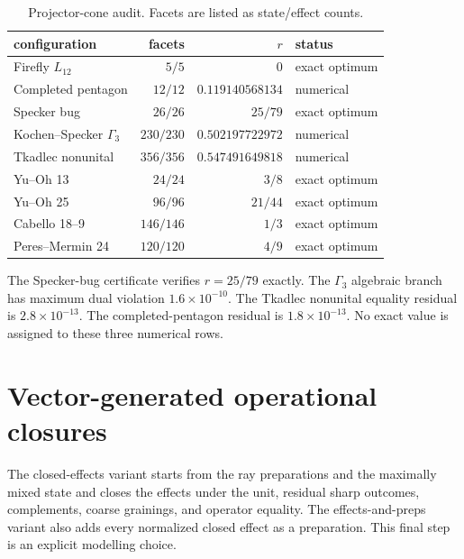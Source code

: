 \documentclass[11pt]{article}
\begin{document}
\begin{table}[ht]
\centering
\caption{Projector-cone audit.  Facets are listed as state/effect counts.}
\label{tab:projector}
\small
\begin{tabular}{lrrl}
\toprule
configuration & facets & $r$ & status\\
\midrule
Firefly $L_{12}$ & $5/5$ & $0$ & exact optimum\\
Completed pentagon & $12/12$ & $0.119140568134$ & numerical\\
Specker bug & $26/26$ & $25/79$ & exact optimum\\
Kochen--Specker $\Gamma_3$ & $230/230$ & $0.502197722972$ & numerical\\
Tkadlec nonunital & $356/356$ & $0.547491649818$ & numerical\\
Yu--Oh 13 & $24/24$ & $3/8$ & exact optimum\\
Yu--Oh 25 & $96/96$ & $21/44$ & exact optimum\\
Cabello 18--9 & $146/146$ & $1/3$ & exact optimum\\
Peres--Mermin 24 & $120/120$ & $4/9$ & exact optimum\\
\bottomrule
\end{tabular}
\end{table}

The Specker-bug certificate verifies $r=25/79$ exactly.  The $\Gamma_3$
algebraic branch has maximum dual violation $1.6\times10^{-10}$.  The Tkadlec
nonunital equality residual is $2.8\times10^{-13}$.  The completed-pentagon
residual is $1.8\times10^{-13}$.  No exact value is assigned to these three
numerical rows.

\section{Vector-generated operational closures}

The closed-effects variant starts from the ray preparations and the maximally
mixed state and closes the effects under the unit, residual sharp outcomes,
complements, coarse grainings, and operator equality.  The effects-and-preps
variant also adds every normalized closed effect as a preparation.  This final
step is an explicit modelling choice.
\end{document}
